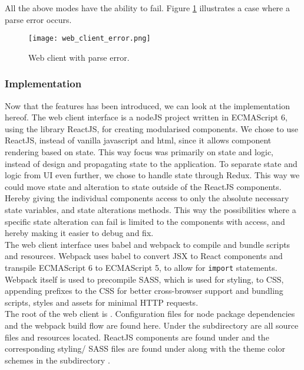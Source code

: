 \noindent
All the above modes have the ability to fail. Figure \ref{fig:web_client_error} illustrates a case where a parse error occurs.

\begin{figure}[H]
  \texttt{[image: web\_client\_error.png]}
  \caption{Web client with parse error.}
  \label{fig:web_client_error}
\end{figure}


\subsubsection{Implementation}

\noindent
Now that the features has been introduced, we can look at the implementation hereof.
The web client interface is a nodeJS project written in ECMAScript 6, using the library ReactJS, for creating modularised components.
We chose to use ReactJS, instead of vanilla javascript and html, since it allows component rendering based on state.
This way focus was primarily on state and logic, instead of design and propagating state to the application.
To separate state and logic from UI even further, we chose to handle state through Redux.
This way we could move state and alteration to state outside of the ReactJS components. Hereby giving the individual components access to only the absolute necessary state variables, and state alterations methods.
This way the possibilities where a specific state alteration can fail is limited to the components with access, and hereby making it easier to debug and fix.\\

\noindent
The web client interface uses babel and webpack to compile and bundle scripts and resources.
Webpack uses babel to convert JSX to React components and transpile ECMAScript 6 to ECMAScript 5, to allow for \texttt{import} statements.
Webpack itself is used to precompile SASS, which is used for styling, to CSS, appending prefixes to the CSS for better cross-browser support and bundling scripts, styles and assets for minimal HTTP requests.\\

\noindent
The root of the web client is . Configuration files for node package dependencies and the webpack build flow are found here.
Under the subdirectory  are all source files and resources located.
ReactJS components are found under  and the corresponding styling/ SASS files are found under  along with the theme color schemes in the subdirectory .\\

